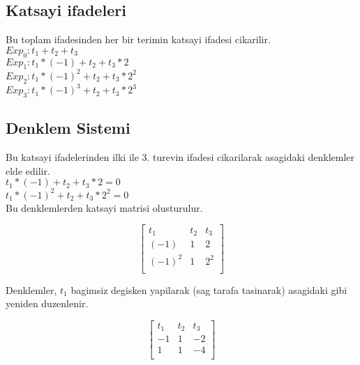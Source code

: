 \documentclass{article}
\begin{document}
\subsection{Katsayi ifadeleri}
Bu toplam ifadesinden her bir terimin katsayi ifadesi cikarilir.\\
$\displaystyle Exp_{0}: t_{1}+t_{2}+t_{3}$\\
$\displaystyle Exp_{1}: t_{1}*(-1)+t_{2}+t_{3}*2$\\
$\displaystyle Exp_{2}: t_{1}*(-1)^{2}+t_{2}+t_{3}*2^{2}$\\
$\displaystyle Exp_{3}: t_{1}*(-1)^{3}+t_{2}+t_{3}*2^{3}$\\
\subsection{Denklem Sistemi}
Bu katsayi ifadelerinden ilki ile 3. turevin ifadesi cikarilarak asagidaki denklemler elde edilir.\\
$\displaystyle t_{1}*(-1)+t_{2}+t_{3}*2=0$\\
$\displaystyle t_{1}*(-1)^{2}+t_{2}+t_{3}*2^{2}=0$\\
Bu denklemlerden katsayi matrisi olusturulur.
\begin{center}
$$ \left[\begin{array}{rrr}
t_{1} & t_{2} & t_{3}\\
(-1) & 1 & 2\\
(-1)^{2} & 1 & 2^{2}\\
\end{array}\right] $$
\end{center}
Denklemler, $t_{1}$ bagimsiz degisken yapilarak (sag tarafa tasinarak) asagidaki gibi yeniden duzenlenir.\\
\begin{center}
$$ \left[\begin{array}{rr|r}
t_{1} & t_{2} & t_{3}\\
-1 & 1 & -2\\
1 & 1 & -4\\
\end{array}\right] $$
\end{center}
\end{document}

